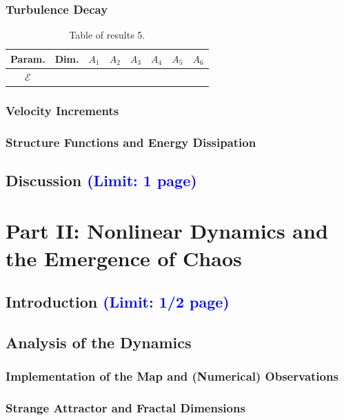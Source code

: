 \documentclass[11pt,titlepage]{article}
\begin{document}
\subsubsection{Turbulence Decay}
\begin{table}[h!]
\centering
\caption{Table of results 5.}
    \begin{tabular}{ | c | c | c | c | c | c | c | c |}
        \hline
        Param. & Dim. & $A_1$ & $A_2$ & $A_3$ & $A_4$ & $A_5$ & $A_6$ \\
        \hline
        $\mathcal{E}$ & & & & & & & \\
        \hline
    \end{tabular}
\end{table}

\subsubsection{Velocity Increments}

\subsubsection{Structure Functions and Energy Dissipation}

\subsection{Discussion \textcolor{blue}{(Limit: 1 page)}} %

\newpage
\section{Part II: Nonlinear Dynamics and the Emergence of Chaos}


\subsection{Introduction \textcolor{blue}{(Limit: 1/2 page)}} %
\subsection{Analysis of the Dynamics}
\subsubsection{Implementation of the Map and (Numerical) Observations}
\subsubsection{Strange Attractor and Fractal Dimensions}
\end{document}
